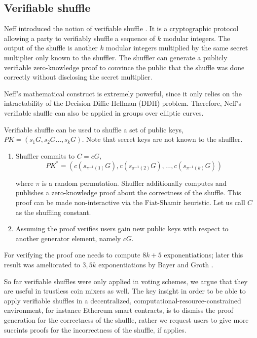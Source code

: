 \documentclass[conference, compsoc]{IEEEtran}
\theoremstyle{definition}
\begin{document}
\subsection{Verifiable shuffle}

Neff introduced the notion of verifiable shuffle \cite{neff2001verifiable}. It is a cryptographic protocol allowing a party to verifiably shuffle a sequence of $k$ modular integers. The output of the shuffle is another $k$ modular integers multiplied by the same secret multiplier only known to the shuffler. The shuffler can generate a publicly verifiable zero-knowledge proof to convince the public that the shuffle was done correctly without disclosing the secret multiplier. 

Neff's mathematical construct is extremely powerful, since it only relies on the intractability of the Decision Diffie-Hellman (DDH) problem. Therefore, Neff's verifiable shuffle can also be applied in groups over elliptic curves.

Verifiable shuffle can be used to shuffle a set of public keys, $PK=(s_{1}G,s_{2}G\dots,s_{k}G)$. Note that secret keys are not known to the shuffler.

\begin{enumerate}
	\item Shuffler commits to $C=cG$, 
		$$PK^*=(c(s_{\pi^{-1}(1)}G),c(s_{\pi^{-1}(2)}G),\dots,c({s_{\pi^{-1}(k)}}G))$$

	  where $\pi$ is a random permutation. Shuffler additionally computes and publishes a zero-knowledge proof about the correctness of the shuffle. This proof can be made non-interactive via the Fiat-Shamir heuristic. Let us call $C$ as the shuffling constant.
	\item Assuming the proof verifies users gain new public keys with respect to another generator element, namely $cG$.
\end{enumerate}

For verifying the proof one needs to compute $8k+5$ exponentiations; later this result was ameliorated to $3,5k$ exponentiations by Bayer and Groth \cite{bayer2012efficient}.

So far verifiable shuffles were only applied in voting schemes, we argue that they are useful in trustless coin mixers as well. The key insight in order to be able to apply verifiable shuffles in a decentralized, computational-resource-constrained environment, for instance Ethereum smart contracts, is to dismiss the proof generation for the correctness of the shuffle, rather we request users to give more succints proofs for the incorrectness of the shuffle, if applies.   
\end{document}
